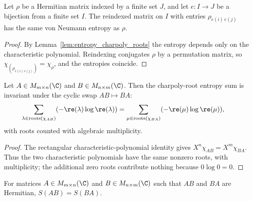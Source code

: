 \begin{theorem}
    \label{thm:entropy_submatrix_equiv}
    \leanok
    Let $\rho$ be a Hermitian matrix indexed by a finite set $J$, and let
    $e : I \to J$ be a bijection from a finite set $I$. The reindexed matrix on
    $I$ with entries $\rho_{e(i)\,e(j)}$ has the same von Neumann entropy as
    $\rho$.
\end{theorem}

\begin{proof}\leanok
    By Lemma~\ref{lem:entropy_charpoly_roots} the entropy depends only on the
    characteristic polynomial. Reindexing conjugates $\rho$ by a permutation
    matrix, so $\chi_{(\rho_{e(i)\,e(j)})}=\chi_\rho$, and the entropies
    coincide.
\end{proof}

\begin{lemma}
    \label{lem:charpoly_root_entropy_cyclic_swap}
    \leanok
    Let $A \in M_{m \times n}(\C)$ and
    $B \in M_{n \times m}(\C)$. Then the charpoly-root entropy sum is
    invariant under the cyclic swap $AB \mapsto BA$:
    \begin{align}
        \sum_{\lambda \in \mathrm{roots}(\chi_{AB})}
        ({-}\re(\lambda)\log\re(\lambda))
        &=
        \sum_{\mu \in \mathrm{roots}(\chi_{BA})}
        ({-}\re(\mu)\log\re(\mu)),
        \label{eq:entropy_charpoly_cyclic}
    \end{align}
    with roots counted with algebraic multiplicity.
\end{lemma}

\begin{proof}\leanok
    The rectangular characteristic-polynomial identity gives
    $X^n\chi_{AB}=X^m\chi_{BA}$. Thus the two characteristic polynomials have
    the same nonzero roots, with multiplicity; the additional zero roots
    contribute nothing because $0\log 0=0$.
\end{proof}

\begin{theorem}
    \label{thm:entropy_mul_comm}
    \leanok
    For matrices $A \in M_{m \times n}(\C)$ and
    $B \in M_{n \times m}(\C)$ such that $AB$ and $BA$ are Hermitian,
    $S(AB)=S(BA)$.
\end{theorem}

